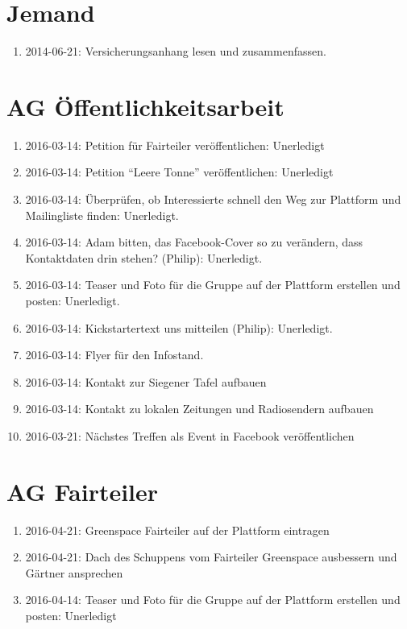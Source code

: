 \documentclass{scrreprt}
\begin{document}
    \section{Jemand}
    \begin{enumerate}
    	\item 2014-06-21: Versicherungsanhang lesen und zusammenfassen.
    \end{enumerate}
    
    \section{AG Öffentlichkeitsarbeit}
    \begin{enumerate}
   		\item 2016-03-14: Petition für Fairteiler veröffentlichen: Unerledigt
   		\item 2016-03-14: Petition \enquote{Leere Tonne} veröffentlichen: Unerledigt
   		\item 2016-03-14: Überprüfen, ob Interessierte schnell den Weg zur Plattform und Mailingliste finden: Unerledigt.
   		\item 2016-03-14: Adam bitten, das Facebook-Cover so zu verändern, dass Kontaktdaten drin stehen? (Philip): Unerledigt. 
   		\item 2016-03-14: Teaser und Foto für die Gruppe auf der Plattform erstellen und posten: Unerledigt.
   		\item 2016-03-14: Kickstartertext uns mitteilen (Philip): Unerledigt. 
    	\item 2016-03-14: Flyer für den Infostand.
  		\item 2016-03-14: Kontakt zur Siegener Tafel aufbauen
   		\item 2016-03-14: Kontakt zu lokalen Zeitungen und Radiosendern aufbauen
   		\item 2016-03-21: Nächstes Treffen als Event in Facebook veröffentlichen 
    \end{enumerate}  		
    
    \section{AG Fairteiler}
    \begin{enumerate}
   		\item 2016-04-21: Greenspace Fairteiler auf der Plattform eintragen
   		\item 2016-04-21: Dach des Schuppens vom Fairteiler Greenspace ausbessern und Gärtner ansprechen
   		\item 2016-04-14: Teaser und Foto für die Gruppe auf der Plattform erstellen und posten: Unerledigt
    \end{enumerate}
    
\end{document}
